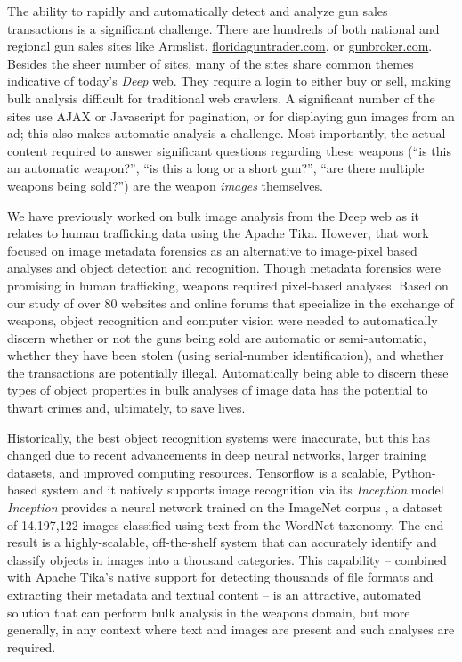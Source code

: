 The ability to rapidly and automatically detect and analyze gun sales transactions is a significant challenge. There are hundreds of both national and regional gun sales sites like Armslist, \url{floridaguntrader.com}, or \url{gunbroker.com}. Besides the sheer number of sites, many of the sites share common themes indicative of today's {\em Deep} web. They require a login to either buy or sell, making bulk analysis difficult for traditional web crawlers. A significant number of the sites use AJAX or Javascript for pagination, or for displaying gun images from an ad; this also makes automatic analysis a challenge. Most importantly, the actual content required to answer significant questions regarding these weapons (``is this an automatic weapon?'', ``is this a long or a short gun?'', ``are there multiple weapons being sold?'') are the weapon {\em images} themselves.

We have previously worked on bulk image analysis from the Deep web as it relates to human trafficking data \cite{mattmann7tg} using the Apache Tika. However, that work focused on image metadata forensics as an alternative to image-pixel based analyses and object detection and recognition. Though metadata forensics were promising in human trafficking, weapons required pixel-based analyses. Based on our study of over 80 websites and online forums that specialize in the exchange of weapons, object recognition and computer vision were needed to automatically discern whether or not the guns being sold are automatic or semi-automatic, whether they have been stolen (using serial-number identification), and whether the transactions are potentially illegal. Automatically being able to discern these types of object properties in bulk analyses of image data has the potential to thwart crimes and, ultimately, to save lives.

Historically, the best object recognition systems were inaccurate, but this has changed due to recent advancements in deep neural networks, larger training datasets, and improved computing resources. Tensorflow is a scalable, Python-based system and it natively supports image recognition via its \textit{Inception} model \cite{abadi2016tensorflow}. \textit{Inception} provides a neural network trained on the ImageNet corpus \cite{krizhevsky2012imagenet}, a dataset of 14,197,122 images classified using text from the WordNet taxonomy. The end result is a highly-scalable, off-the-shelf system that can accurately identify and classify objects in images into a thousand categories. This capability -- combined with Apache Tika's native support for detecting thousands of file formats and extracting their metadata and textual content -- is an attractive, automated solution that can perform bulk analysis in the weapons domain, but more generally, in any context where text and images are present and such analyses are required.

